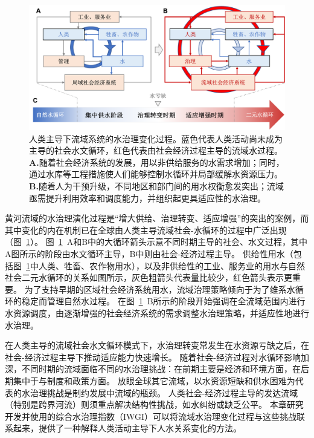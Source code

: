 \begin{figure}[!ht]
	\includegraphics[width=\textwidth]{img/ch4/ch4_transition.png}
	\caption[人类主导下流域系统的水治理阶段过渡]{
		人类主导下流域系统的水治理变化过程。蓝色代表人类活动尚未成为主导的社会\textendash{}水文循环，红色代表由社会经济过程主导的流域水过程。
        \textbf{A.}随着社会经济系统的发展，用以非供给服务的水需求增加；同时，通过水库等工程措施使人们能够控制水循环并局部缓解水资源压力。
        \textbf{B.}随着人为干预升级，不同地区和部门间的用水权衡愈发突出；流域亟需提升利用效率和调度能力，并组织起更具适应性的水治理。
	}\label{fig:summary}
\end{figure}

黄河流域的水治理演化过程是“增大供给、治理转变、适应增强”的突出的案例，而其中变化的内在机制已在全球由人类主导流域社会-水循环的过程中广泛出现（图~\ref{fig:summary}）。
图~\ref{fig:summary}~A和B中的大循环箭头示意不同时期主导的社会、水文过程，其中A图所示的阶段由水文循环主导，B中则由社会-经济过程主导。
供给性用水（包括图~\ref{fig:summary}中人类、牲畜、农作物用水），以及非供给性的工业、服务业的用水与自然\textendash{}社会二元水循环的关系如图所示，灰色粗箭头代表量比较少，红色箭头表示更重要。
为了支持早期的区域社会经济系统用水，流域治理策略倾向于为了维系水循环的稳定而管理自然水过程。
在图~\ref{fig:summary}~B所示的阶段开始强调在全流域范围内进行水资源调度，由逐渐增强的社会经济系统的需求调整水治理策略，并适应性地进行水治理。

在人类主导的流域社会\textendash{}水文循环模式下，水治理转变常发生在水资源亏缺之后，在社会-经济过程主导下推动适应能力快速增长。
随着社会-经济过程对水循环影响加深，不同时期的流域面临不同的水治理挑战：在前期主要是经济和环境方面，在后期集中于与制度和政策方面。
放眼全球其它流域，以水资源短缺和供水困难为代表的水治理挑战是制约发展中流域的瓶颈\cite{allan2019,speed2013,liu2012}。
人类社会-经济过程主导的发达流域（特别是跨界河流）则须重点解决结构性挑战，如水纠纷或缺乏公平\cite{mirumachi2015}。
本章研究开发并使用的综合水治理指数（IWGI）可以将流域水治理变化过程与这些挑战联系起来，提供了一种解释人类活动主导下人\textendash{}水关系变化的方法。

